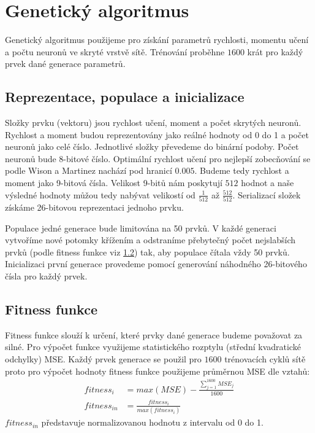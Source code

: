 \documentclass[12pt]{article}
\begin{document}
\section{Genetický algoritmus}
Genetický algoritmus použijeme pro získání parametrů rychlosti, momentu učení a počtu neuronů ve skryté vrstvě sítě. Trénování proběhne $1600$ krát pro každý prvek dané generace parametrů.

\subsection{Reprezentace, populace a inicializace}
Složky prvku (vektoru) jsou rychlost učení, moment a počet skrytých neuronů. Rychlost a moment budou reprezentovány jako reálné hodnoty od 0 do 1 a počet neuronů jako celé číslo. Jednotlivé složky převedeme do binární podoby. Počet neuronů bude 8-bitové číslo. Optimální rychlost učení pro nejlepší zobecňování se podle Wison a Martinez\cite{Wilson_learning_rate} nachází pod hranicí $0.005$. Budeme tedy rychlost a moment jako 9-bitová čísla. Velikost 9-bitů nám poskytují $512$ hodnot a naše výsledné hodnoty můžou tedy nabývat velikostí od $\frac{1}{512}$ až $\frac{512}{512}$. Serializací složek získáme 26-bitovou reprezentaci jednoho prvku.

Populace jedné generace bude limitována na 50 prvků. V každé generaci vytvoříme nové potomky křížením a odstraníme přebytečný počet nejslabších prvků (podle fitness funkce viz \ref{fitness_fce}) tak, aby populace čítala vždy 50 prvků. Inicializaci první generace provedeme pomocí generování náhodného 26-bitového čísla pro každý prvek.

\subsection{Fitness funkce}
\label{fitness_fce}
Fitness funkce slouží k určení, které prvky dané generace budeme považovat za silné. Pro výpočet funkce využijeme statistického rozptylu (střední kvadratické odchylky) MSE. Každý prvek generace se použil pro $1600$ trénovacích cyklů sítě proto pro výpočet hodnoty fitness funkce použijeme průměrnou MSE dle vztahů:
\begin{equation}
\nonumber
\begin{split}
fitness_{i}&=max(MSE)-\frac { \sum _{ j=1 }^{ 1600 }{ { MSE }_{ j } }  }{ 1600 }\\
fitness_{in}&=\frac{fitness_{i}}{max(fitness_{i})}
\end{split}
\end{equation}
$fitness_{in}$ představuje normalizovanou hodnotu z intervalu od 0 do 1.
\end{document}
